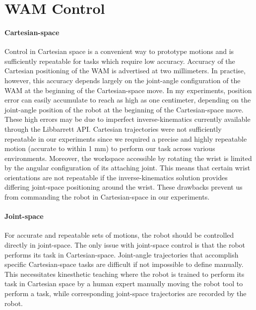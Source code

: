 \section{WAM Control}

\paragraph{Cartesian-space}
Control in Cartesian space is a convenient way to prototype motions and is sufficiently repeatable for tasks which require low accuracy.
Accuracy of the Cartesian positioning of the WAM is advertised at two millimeters.
In practise, however, this accuracy depends largely on the joint-angle configuration of the WAM at the beginning of the Cartesian-space move.
In my experiments, position error can easily accumulate to reach as high as one centimeter, depending on the joint-angle position of the robot at the beginning of the Cartesian-space move.
These high errors may be due to imperfect inverse-kinematics currently available through the Libbarrett API.
Cartesian trajectories were not sufficiently repeatable in our experiments since we required a precise and highly repeatable motion (accurate to within 1 mm) to perform our task across various environments.
Moreover, the workspace accessible by rotating the wrist is limited by the angular configuration of its attaching joint. 
This means that certain wrist orientations are not repeatable if the inverse-kinematics solution provides differing joint-space positioning around the wrist.
These drawbacks prevent us from commanding the robot in Cartesian-space in our experiments.

\paragraph{Joint-space}
For accurate and repeatable sets of motions, the robot should be controlled directly in joint-space.
The only issue with joint-space control is that the robot performs its task in Cartesian-space. 
Joint-angle trajectories that accomplish specific Cartesian-space tasks are difficult if not impossible to define manually.
This necessitates kinesthetic teaching where the robot is trained to perform its task in Cartesian space by a human expert manually moving the robot tool to perform a task, while corresponding joint-space trajectories are recorded by the robot.

